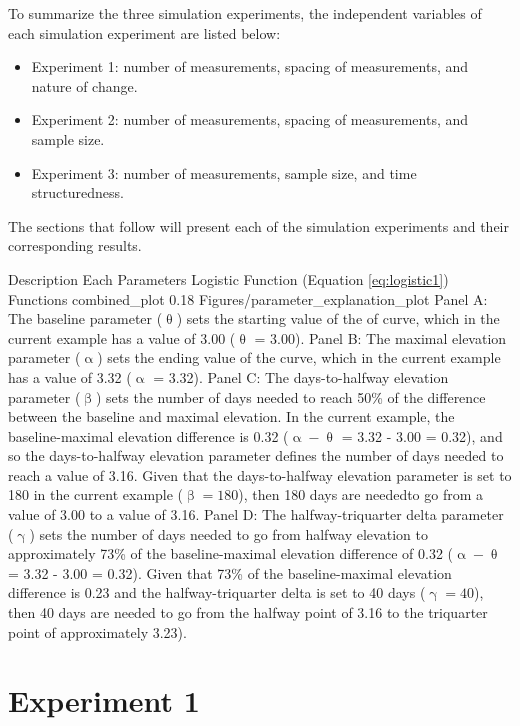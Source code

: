 \documentclass[
12pt, %
twoside,
english]{guelphthesis}
\theoremstyle{definition}
\theoremstyle{definition}
\theoremstyle{definition}
\theoremstyle{definition}
\theoremstyle{remark}
\begin{document}
To summarize the three simulation experiments, the independent variables of each simulation experiment are listed below:
\begin{itemize}
\tightlist
\item
  Experiment 1: number of measurements, spacing of measurements, and nature of change.
\item
  Experiment 2: number of measurements, spacing of measurements, and sample size.
\item
  Experiment 3: number of measurements, sample size, and time structuredness.
\end{itemize}
\noindent The sections that follow will present each of the simulation experiments and their corresponding results.
\begin{apaFigure}
[landscape]
[samepage]
[0cm]
{Description Each Parameters Logistic Function (Equation \ref{eq:logistic1}) Functions}
{combined_plot}
{0.18}
{Figures/parameter_explanation_plot}
{Panel A: The baseline parameter ($\uptheta$) sets the starting value of the of curve, which in the current example has a value of 3.00 ($\uptheta$ = 3.00). Panel B: The maximal elevation parameter ($\upalpha$) sets the ending value of the curve, which in the current example has a value of 3.32 ($\upalpha$ = 3.32). Panel C: The days-to-halfway elevation parameter ($\upbeta$) sets the number of days needed to reach 50\% of the difference between the baseline and maximal elevation. In the current example, the baseline-maximal elevation difference is 0.32 ($\upalpha - \uptheta$ = 3.32 - 3.00 = 0.32), and so the days-to-halfway elevation parameter defines the number of days needed to reach a value of 3.16. Given that the days-to-halfway elevation parameter is set to 180 in the current example ($\upbeta = 180$), then 180 days are neededto go from a value of 3.00 to a value of 3.16. Panel D: The halfway-triquarter delta parameter ($\upgamma$) sets the number of days needed to go from halfway elevation to approximately 73\% of the baseline-maximal elevation difference of 0.32 ($\upalpha - \uptheta$ = 3.32 - 3.00 = 0.32). Given that 73\% of the baseline-maximal elevation difference is 0.23 and the halfway-triquarter delta is set to 40 days ($\upgamma = 40$), then 40 days are needed to go from the halfway point of 3.16 to the triquarter point of approximately 3.23).}
\end{apaFigure}
\hypertarget{experiment-1}{%
\chapter{Experiment 1}\label{experiment-1}}
\end{document}
